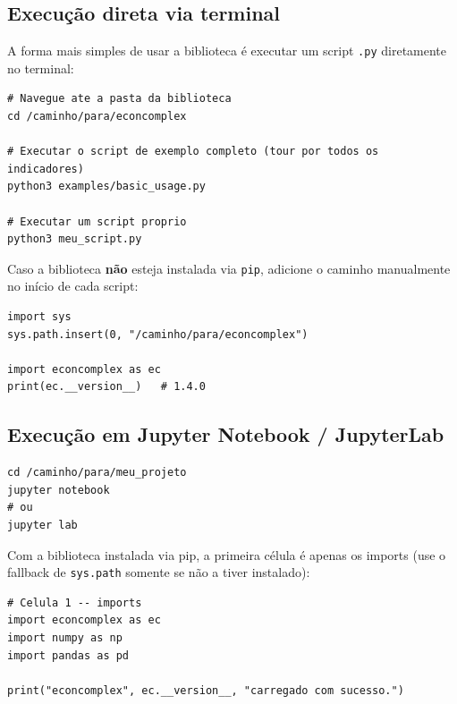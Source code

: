 \documentclass[12pt, a4paper]{article}
\begin{document}
\subsection{Execu\c{c}\~{a}o direta via terminal}

A forma mais simples de usar a biblioteca \'{e} executar um script
\texttt{.py} diretamente no terminal:

\begin{lstlisting}[style=bashstyle,
  caption={Execu\c{c}\~{a}o de scripts no terminal}]
# Navegue ate a pasta da biblioteca
cd /caminho/para/econcomplex

# Executar o script de exemplo completo (tour por todos os indicadores)
python3 examples/basic_usage.py

# Executar um script proprio
python3 meu_script.py
\end{lstlisting}

Caso a biblioteca \textbf{n\~{a}o} esteja instalada via \texttt{pip},
adicione o caminho manualmente no in\'{i}cio de cada script:

\begin{lstlisting}[caption={Adicionar caminho ao sys.path (sem pip install)}]
import sys
sys.path.insert(0, "/caminho/para/econcomplex")

import econcomplex as ec
print(ec.__version__)   # 1.4.0
\end{lstlisting}

\subsection{Execu\c{c}\~{a}o em Jupyter Notebook / JupyterLab}

\begin{lstlisting}[style=bashstyle,
  caption={Abrir Jupyter a partir da pasta do seu projeto}]
cd /caminho/para/meu_projeto
jupyter notebook
# ou
jupyter lab
\end{lstlisting}

Com a biblioteca instalada via pip, a primeira c\'{e}lula \'{e} apenas
os imports (use o fallback de \texttt{sys.path} somente se n\~{a}o a
tiver instalado):

\begin{lstlisting}[caption={C\'{e}lula de configura\c{c}\~{a}o no Jupyter}]
# Celula 1 -- imports
import econcomplex as ec
import numpy as np
import pandas as pd

print("econcomplex", ec.__version__, "carregado com sucesso.")
\end{lstlisting}
\end{document}
